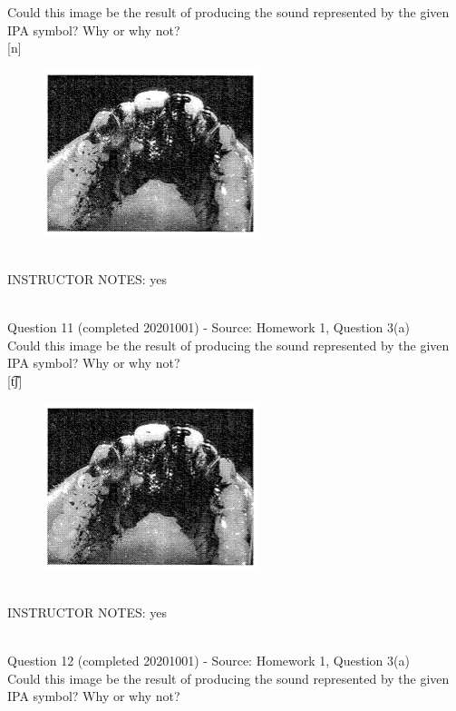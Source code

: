 \documentclass[12pt]{article}
\begin{document}
Could this image be the result of producing the sound represented by the given IPA symbol? Why or why not?\\

{[n]}

\begin{figure}[H]
\includegraphics{../images/staticpalatography_stop.png}
\end{figure}

~\\
INSTRUCTOR NOTES: yes


~\\

{\large Question 11} (completed 20201001) - Source: Homework 1, Question 3(a)\\

Could this image be the result of producing the sound represented by the given IPA symbol? Why or why not?\\

{[t͡ʃ]}

\begin{figure}[H]
\includegraphics{../images/staticpalatography_stop.png}
\end{figure}

~\\
INSTRUCTOR NOTES: yes


~\\

{\large Question 12} (completed 20201001) - Source: Homework 1, Question 3(a)\\

Could this image be the result of producing the sound represented by the given IPA symbol? Why or why not?\\
\end{document}
